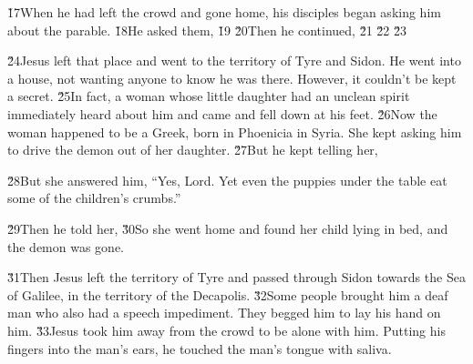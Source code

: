 \v{17}When he had left the crowd and gone home, his disciples began asking him about the parable. \v{18}He asked them,  \v{19} \v{20}Then he continued,  \v{21} \v{22} \v{23}

\v{24}Jesus left that place and went to the territory of Tyre and Sidon. He went into a house, not wanting anyone to know he was there. However, it couldn't be kept a secret. \v{25}In fact, a woman whose little daughter had an unclean spirit immediately heard about him and came and fell down at his feet. \v{26}Now the woman happened to be a Greek, born in Phoenicia in Syria. She kept asking him to drive the demon out of her daughter. \v{27}But he kept telling her, 

\v{28}But she answered him, ``Yes, Lord. Yet even the puppies under the table eat some of the children's crumbs.''

\v{29}Then he told her,  \v{30}So she went home and found her child lying in bed, and the demon was gone.

\v{31}Then Jesus left the territory of Tyre and passed through Sidon towards the Sea of Galilee, in the territory of the Decapolis. \v{32}Some people brought him a deaf man who also had a speech impediment. They begged him to lay his hand on him. \v{33}Jesus took him away from the crowd to be alone with him. Putting his fingers into the man's ears, he touched the man's tongue with saliva.

